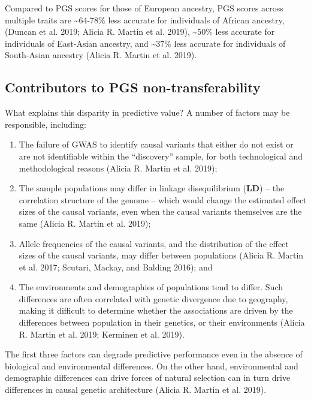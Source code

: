 \documentclass[
]{book}
\begin{document}
Compared to PGS scores for those of European ancestry, PGS scores across multiple traits are \textasciitilde64-78\% less accurate for individuals of African ancestry, (Duncan et al. 2019; Alicia R. Martin et al. 2019), \textasciitilde50\% less accurate for individuals of East-Asian ancestry, and \textasciitilde37\% less accurate for individuals of South-Asian ancestry (Alicia R. Martin et al. 2019).

\hypertarget{contributors-to-pgs-non-transferability}{%
\subsection{Contributors to PGS non-transferability}\label{contributors-to-pgs-non-transferability}}

What explains this disparity in predictive value? A number of factors may be responsible, including:

\begin{enumerate}
\def\labelenumi{\arabic{enumi}.}
\item
  The failure of GWAS to identify causal variants that either do not exist or are not identifiable within the ``discovery'' sample, for both technological and methodological reasons (Alicia R. Martin et al. 2019);
\item
  The sample populations may differ in linkage disequilibrium (\textbf{LD}) -- the correlation structure of the genome -- which would change the estimated effect sizes of the causal variants, even when the causal variants themselves are the same (Alicia R. Martin et al. 2019);
\item
  Allele frequencies of the causal variants, and the distribution of the effect sizes of the causal variants, may differ between populations (Alicia R. Martin et al. 2017; Scutari, Mackay, and Balding 2016); and
\item
  The environments and demographies of populations tend to differ. Such differences are often correlated with genetic divergence due to geography, making it difficult to determine whether the associations are driven by the differences between population in their genetics, or their environments (Alicia R. Martin et al. 2019; Kerminen et al. 2019).
\end{enumerate}

The first three factors can degrade predictive performance even in the absence of biological and environmental differences. On the other hand, environmental and demographic differences can drive forces of natural selection can in turn drive differences in causal genetic architecture (Alicia R. Martin et al. 2019).
\end{document}
